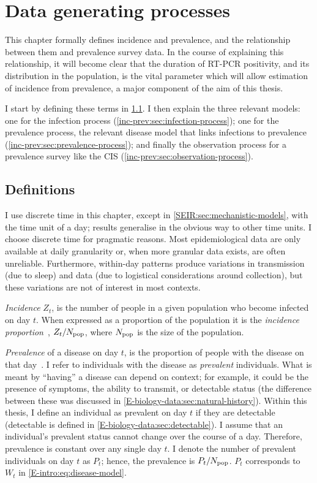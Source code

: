 \documentclass[thesis.tex]{subfiles}
\begin{document}
\ifSubfilesClassLoaded{
  \setcounter{chapter}{2}
}

\chapter{Data generating processes} \label{inc-prev}

This chapter formally defines incidence and prevalence, and the relationship between them and prevalence survey data.
In the course of explaining this relationship, it will become clear that the duration of RT-PCR positivity, and its distribution in the population, is the vital parameter which will allow estimation of incidence from prevalence, a major component of the aim of this thesis.

I start by defining these terms in \cref{inc-prev:sec:definitions}.
I then explain the three relevant models: one for the infection process (\cref{inc-prev:sec:infection-process}); one for the prevalence process, the relevant disease model that links infections to prevalence (\cref{inc-prev:sec:prevalence-process}); and finally the observation process for a prevalence survey like the CIS (\cref{inc-prev:sec:observation-process}).

\section{Definitions} \label{inc-prev:sec:definitions}

I use discrete time in this chapter, except in \cref{SEIR:sec:mechanistic-models}, with the time unit of a day; results generalise in the obvious way to other time units.
I choose discrete time for pragmatic reasons.
Most epidemiological data are only available at daily granularity or, when more granular data exists, are often unreliable.
Furthermore, within-day patterns produce variations in transmission (\eg due to sleep) and data (\eg due to logistical considerations around collection), but these variations are not of interest in most contexts.

\emph{Incidence} $Z_t$, is the number of people in a given population who become infected on day $t$.
When expressed as a proportion of the population it is the \emph{incidence proportion}~\autocite[89]{lashModern}, $Z_t/N_\text{pop}$, where $N_\text{pop}$ is the size of the population.

\emph{Prevalence} of a disease on day $t$, is the proportion of people with the disease on that day~\autocite[90]{lashModern}.
I refer to individuals with the disease as \emph{prevalent} individuals.
What is meant by ``having'' a disease can depend on context; for example, it could be the presence of symptoms, the ability to transmit, or detectable status (the difference between these was discussed in \cref{E-biology-data:sec:natural-history}).
Within this thesis, I define an individual as prevalent on day $t$ if they are detectable (detectable is defined in \cref{E-biology-data:sec:detectable}).
I assume that an individual's prevalent status cannot change over the course of a day.
Therefore, prevalence is constant over any single day $t$.
I denote the number of prevalent individuals on day $t$ as $P_t$; hence, the prevalence is $P_t/N_\text{pop}$.
$P_t$ corresponds to $W_t$ in \cref{E-intro:eq:disease-model}.
\end{document}
